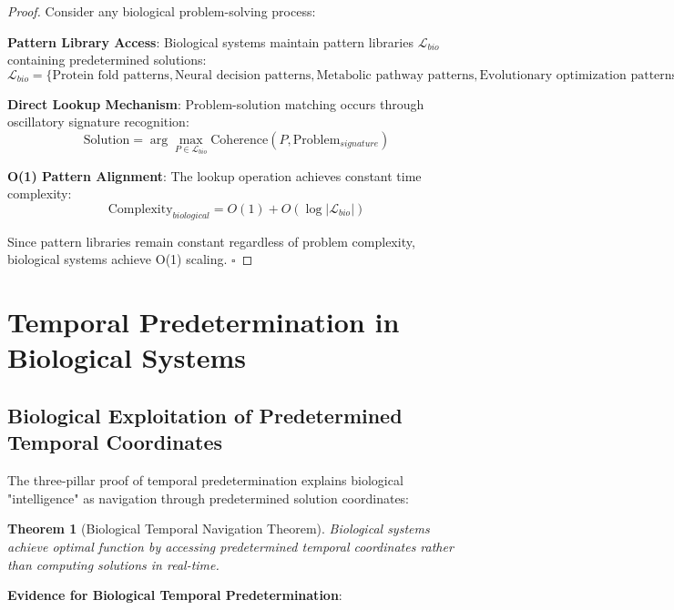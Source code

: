 \documentclass[12pt,a4paper]{article}
\newtheorem{theorem}{Theorem}[section]
\begin{document}
\begin{proof}
Consider any biological problem-solving process:

\textbf{Pattern Library Access}: Biological systems maintain pattern libraries $\mathcal{L}_{bio}$ containing predetermined solutions:
\begin{equation}
\mathcal{L}_{bio} = \{\text{Protein fold patterns}, \text{Neural decision patterns}, \text{Metabolic pathway patterns}, \text{Evolutionary optimization patterns}\}
\end{equation}

\textbf{Direct Lookup Mechanism}: Problem-solution matching occurs through oscillatory signature recognition:
\begin{equation}
\text{Solution} = \arg\max_{P \in \mathcal{L}_{bio}} \text{Coherence}(P, \text{Problem}_{signature})
\end{equation}

\textbf{O(1) Pattern Alignment}: The lookup operation achieves constant time complexity:
\begin{equation}
\text{Complexity}_{biological} = O(1) + O(\log|\mathcal{L}_{bio}|)
\end{equation}

Since pattern libraries remain constant regardless of problem complexity, biological systems achieve O(1) scaling. $\square$
\end{proof}

\section{Temporal Predetermination in Biological Systems}

\subsection{Biological Exploitation of Predetermined Temporal Coordinates}

The three-pillar proof of temporal predetermination \citep{sachikonye2024naked} explains biological "intelligence" as navigation through predetermined solution coordinates:

\begin{theorem}[Biological Temporal Navigation Theorem]
Biological systems achieve optimal function by accessing predetermined temporal coordinates rather than computing solutions in real-time.
\end{theorem}

\textbf{Evidence for Biological Temporal Predetermination}:
\end{document}

